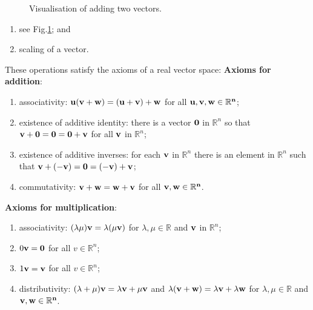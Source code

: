 \begin{figure}
    \centering
    \caption{Visualisation of adding two vectors.}
    \label{fig:vector_add_vis}
\end{figure}

\begin{enumerate}
    \item see Fig.\ref{fig:vector_add_vis}; and
    \item scaling of a vector.
\end{enumerate}

\begin{proposition}
    \label{pro:axioms_of_real_vector_space}
    These operations satisfy the axioms of a real vector space: 
    \textbf{Axioms for addition}:
    \begin{enumerate}
        \item associativity: $\bf u(\bf v+\bf w)=(\bf u+\bf v)+\bf w$ for all $\bf u,\bf v,\bf w\in\mathbb R^n$;
        \item existence of additive identity: there is a vector $\bf 0$ in $\mathbb R^n$ so that $\bf v+\bf0=\bf0=\bf0+\bf v$ for all $\bf v$ in $\mathbb R^n$;
        \item existence of additive inverses: for each $\bf v$ in $\mathbb R^n$ there is an element in $\mathbb R^n$ such that $\bf v+(-\bf v)=\bf0=(-\bf v)+\bf v$;
        \item commutativity: $\bf v+\bf w=\bf w+\bf v$ for all $\bf v,\bf w\in\mathbb R^n$.
    \end{enumerate}
 
    \textbf{Axioms for multiplication}:
    \begin{enumerate}
        \item associativity: $(\lambda\mu)\bf v=\lambda(\mu\bf v)$ for $\lambda,\mu\in\mathbb R$ and $\bf v$ in $\mathbb R^n$;
        \item $0\bf v=\bf0$ for all $v\in\mathbb R^n$;
        \item $1\bf v=\bf v$ for all $v\in\mathbb R^n$;
        \item distributivity: $(\lambda+\mu)\bf v=\lambda\bf v+\mu\bf v$ and $\lambda(\bf v+\bf w)=\lambda\bf v+\lambda\bf w$ for $\lambda,\mu\in\mathbb R$ and $\bf v,\bf w\in\mathbb R^n$.
    \end{enumerate}
\end{proposition}


